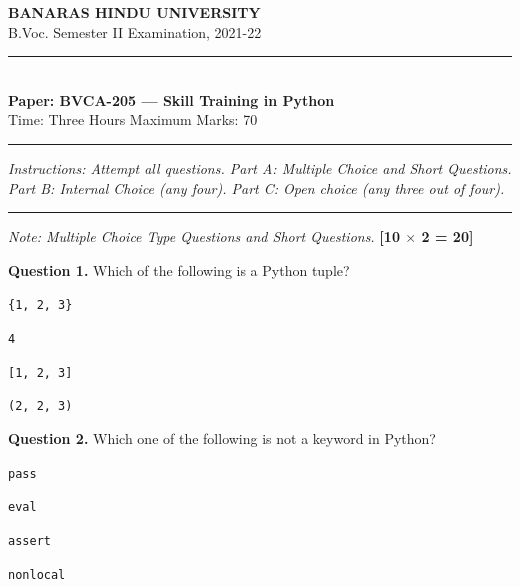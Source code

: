 \documentclass[11pt,a4paper]{article}
\begin{document}
\begin{center}
  {\large\bfseries BANARAS HINDU UNIVERSITY}\\[2pt]
  {
\normalsize B.Voc. Semester II Examination, 2021-22}\\[6pt]
  \rule{0.8\linewidth}{0.5pt}\\[6pt]
  {\large\bfseries Paper: BVCA-205 --- Skill Training in Python}\\[4pt]
  {
\normalsize Time: Three Hours \hfill Maximum Marks: 70}
\end{center}

\rule{\linewidth}{0.4pt}

\smallskip



\noindent   \textit{Instructions: Attempt all questions. Part A: Multiple Choice and Short Questions. Part B: Internal Choice (any four). Part C: Open choice (any three out of four).}

\bigskip

\bigskip


\rule{\linewidth}{0.4pt}\smallskip




\noindent   \textit{Note: Multiple Choice Type Questions and Short Questions.} \hfill   \textbf{[10 $ \times$ 2 = 20]}

\medskip


\noindent   \textbf{Question 1.} Which of the following is a Python tuple?

\begin{parts}
  \item   \texttt{\{1, 2, 3\}}
  \item   \texttt{4}
  \item   \texttt{[1, 2, 3]}
  \item   \texttt{(2, 2, 3)}
\end{parts}

\medskip


\noindent   \textbf{Question 2.} Which one of the following is not a keyword in Python?

\begin{parts}
  \item   \texttt{pass}
  \item   \texttt{eval}
  \item   \texttt{assert}
  \item   \texttt{nonlocal}
\end{parts}

\medskip
\end{document}
